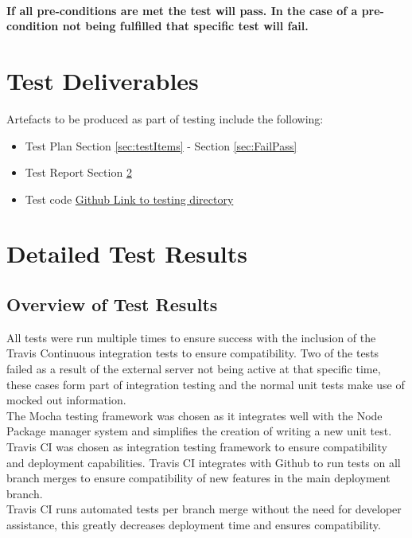\documentclass{article}
\begin{document}
\paragraph{If all pre-conditions are met the test will pass. In the case of a pre-condition not being fulfilled that specific test will fail.}


\section{Test Deliverables}
Artefacts to be produced as part of testing include the following:
\begin{itemize}
\item Test Plan Section \ref{sec:testItems} - Section \ref{sec:FailPass}
\item Test Report Section \ref{sec:testReport}
\item Test code \href{https://github.com/QuintonWeenink/ValknutSolutions/tree/develop/test}{Github Link to testing directory}
\end{itemize}
\clearpage
\section{Detailed Test Results}\label{sec:testReport}
\subsection{Overview of Test Results}
All tests were run multiple times to ensure success with the inclusion of the Travis Continuous integration tests to ensure compatibility. Two of the tests failed as a result of the external server not being active at that specific time, these cases form part of integration testing and the normal unit tests make use of mocked out information.\\
The Mocha testing framework was chosen as it integrates well with the Node Package manager system and 
simplifies the creation of writing a new unit test.\\
Travis CI was chosen as integration testing framework to ensure compatibility and deployment capabilities. Travis CI integrates with Github to run tests on all branch merges to ensure compatibility of new features in the main deployment branch.\\
Travis CI runs automated tests per branch merge without the need for developer assistance, this greatly decreases deployment time and ensures compatibility.
\end{document}

